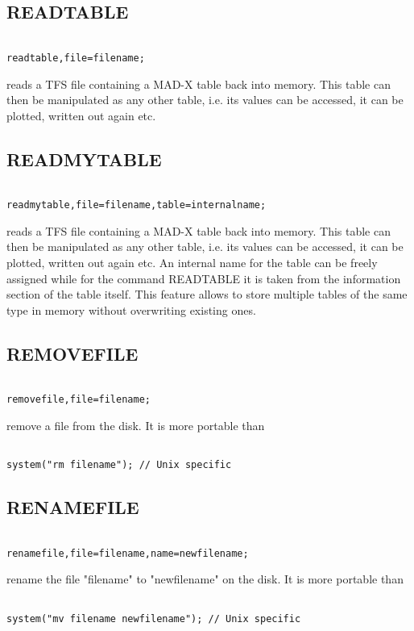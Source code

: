 \subsection{READTABLE}
\begin{verbatim}

readtable,file=filename;
\end{verbatim} 
reads a TFS file containing a MAD-X table back into memory. This table
can then be manipulated as any other table, i.e. its values can be
accessed, it can be plotted, written out again etc.  


\subsection{READMYTABLE}
\begin{verbatim}

readmytable,file=filename,table=internalname;
\end{verbatim} 
reads a TFS file containing a MAD-X table back into memory. This table
can then be manipulated as any other table, i.e. its values can be
accessed, it can be plotted, written out again etc. An internal name for
the table can be freely assigned while for the command READTABLE it is
taken from the information section of the table itself. This feature
allows to store multiple tables of the same type in memory without
overwriting existing ones.  


\subsection{REMOVEFILE}
\begin{verbatim}

removefile,file=filename;
\end{verbatim} 
remove a file from the disk. It is more portable than  
\begin{verbatim}

system("rm filename"); // Unix specific
\end{verbatim}


\subsection{RENAMEFILE}
\begin{verbatim}

renamefile,file=filename,name=newfilename;
\end{verbatim} 
rename the file "filename" to "newfilename" on the disk. It is more
portable than  
\begin{verbatim}

system("mv filename newfilename"); // Unix specific
\end{verbatim}


